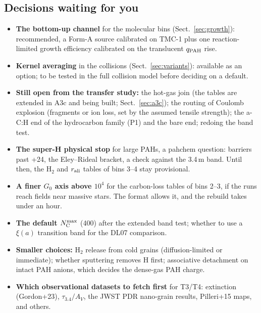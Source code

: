 \documentclass[11pt,a4paper]{article}
\newcommand{\NC}{N_{\rm C}}
\begin{document}
\subsection{Decisions waiting for you}
\begin{itemize}
\item \textbf{The bottom-up channel} for the molecular bins (Sect.~\ref{sec:growth}): recommended, a Form-A source
  calibrated on TMC-1 plus one reaction-limited growth efficiency calibrated on the translucent $q_{\rm PAH}$ rise.
\item \textbf{Kernel averaging} in the collisions (Sect.~\ref{sec:variants}): available as an option; to be tested in
  the full collision model before deciding on a default.
\item \textbf{Still open from the transfer study:} the hot-gas join (the tables are extended in A3c and being built;
  Sect.~\ref{sec:a3c}); the routing of Coulomb explosion (fragments or ion
  loss, set by the assumed tensile strength); the a-C:H end of the hydrocarbon family (P1) and the bare end; redoing
  the band test.
\item \textbf{The super-H physical stop} for large PAHs, a pahchem question: barriers past +24, the Eley--Rideal bracket,
  a check against the 3.4\,\textmu m band. Until then, the H$_2$ and $r_{\rm ali}$ tables of bins 3--4 stay provisional.
\item \textbf{A finer $G_0$ axis above $10^4$} for the carbon-loss tables of bins 2--3, if the runs reach fields near
  massive stars. The format allows it, and the rebuild takes under an hour.
\item \textbf{The default $\NC^{\max}$} (400) after the extended band test; whether to use a $\xi(a)$ transition band
  for the DL07 comparison.
\item \textbf{Smaller choices:} H$_2$ release from cold grains (diffusion-limited or immediate); whether sputtering
  removes H first; associative detachment on intact PAH anions, which decides the dense-gas PAH charge.
\item \textbf{Which observational datasets to fetch first} for T3/T4: extinction (Gordon+23), $\tau_{3.4}/A_V$, the JWST
  PDR nano-grain results, Pilleri+15 maps, and others.
\end{itemize}
\end{document}
